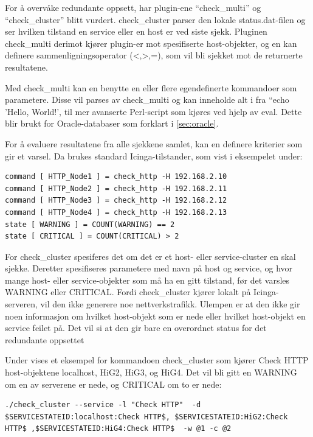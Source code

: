 For å overvåke redundante oppsett, har plugin-ene ``check\_multi'' \cite{checkmulti} og ``check\_cluster'' \cite{checkcluster} blitt vurdert. check\_cluster parser den lokale status.dat-filen og ser hvilken tilstand en service eller en host er ved siste sjekk. Pluginen check\_multi derimot kjører plugin-er mot spesifiserte host-objekter, og en kan definere sammenligningsoperator (<,>,=), som vil bli sjekket mot de returnerte resultatene.

Med check\_multi kan en benytte en eller flere egendefinerte kommandoer som parametere. Disse vil parses av check\_multi og kan inneholde alt i fra ``echo 'Hello, World!', til mer avanserte Perl-script som kjøres ved hjelp av eval. Dette blir brukt for Oracle-databaser som forklart i \ref{sec:oracle}. 

For å evaluere resultatene fra alle sjekkene samlet, kan en definere kriterier som gir et varsel. Da brukes standard Icinga-tilstander, som vist i eksempelet under:
\begin{lstlisting}[style=example]
command [ HTTP_Node1 ] = check_http -H 192.168.2.10
command [ HTTP_Node2 ] = check_http -H 192.168.2.11
command [ HTTP_Node3 ] = check_http -H 192.168.2.12
command [ HTTP_Node4 ] = check_http -H 192.168.2.13
state [ WARNING ] = COUNT(WARNING) == 2
state [ CRITICAL ] = COUNT(CRITICAL) > 2
\end{lstlisting}
For check\_cluster spesiferes det om det er et host- eller service-cluster en skal sjekke. Deretter spesifiseres parametere med navn på host og service, og hvor mange host- eller service-objekter som må ha en gitt tilstand, før det varsles WARNING eller CRITICAL. Fordi check\_cluster kjører lokalt på Icinga-serveren, vil den ikke generere noe nettverkstrafikk. Ulempen er at den ikke gir noen informasjon om hvilket host-objekt som er nede eller hvilket host-objekt en service feilet på. Det vil si at den gir bare en overordnet status for det redundante oppsettet     

Under vises et eksempel for kommandoen check\_cluster som kjører Check HTTP host-objektene localhost, HiG2, HiG3, og HiG4. Det vil bli gitt en WARNING om en av serverene er nede, og CRITICAL om to er nede: 
\begin{lstlisting}[style=example]
./check_cluster --service -l "Check HTTP"  -d $SERVICESTATEID:localhost:Check HTTP$, $SERVICESTATEID:HiG2:Check HTTP$ ,$SERVICESTATEID:HiG4:Check HTTP$  -w @1 -c @2
\end{lstlisting}

